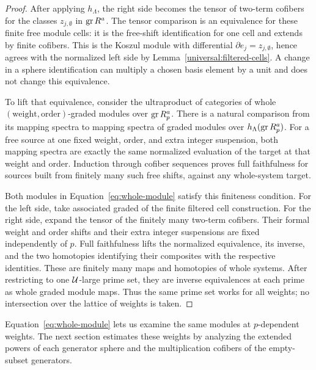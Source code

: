 \begin{proof}
After applying $h_\Lambda$, the right side becomes the tensor
of two-term cofibers for the classes $z_{j,\emptyset}$ in
$\operatorname{gr} R^a$. The tensor comparison is an equivalence for
these finite free module cells: it is the free-shift
identification for one cell and extends by finite cofibers.
This is the Koszul module with differential
$\partial e_j=z_{j,\emptyset}$, hence agrees with the
normalized left side by
Lemma~\ref{universal:filtered-cells}. A change in a sphere
identification can multiply a chosen basis element by a
unit and does not change this equivalence.

To lift that equivalence, consider the ultraproduct of
categories of whole $(\text{weight},\text{order})$-graded
modules over $\operatorname{gr} R_p^a$. There is a natural comparison
from its mapping spectra to mapping spectra of graded
modules over $h_\Lambda(\operatorname{gr} R_p^a)$. For a free source
at one fixed weight, order, and extra integer suspension,
both mapping spectra are exactly the same normalized
evaluation of the target at that weight and order.
Induction through cofiber sequences proves full faithfulness
for sources built from finitely many such free shifts,
against any whole-system target.

Both modules in Equation~\eqref{eq:whole-module} satisfy
this finiteness condition. For the left side, take
associated graded of the finite filtered cell construction.
For the right side, expand the tensor of the finitely many
two-term cofibers. Their formal weight and order shifts and
their extra integer suspensions are fixed independently
of $p$. Full faithfulness lifts the normalized equivalence,
its inverse, and the two homotopies identifying their
composites with the respective identities. These are
finitely many maps and homotopies of whole systems. After
restricting to one $\mathcal U$-large prime set, they are inverse
equivalences at each prime as whole graded module maps.
Thus the same prime set works for all weights; no
intersection over the lattice of weights is taken.
\end{proof}

Equation~\eqref{eq:whole-module} lets us examine the same modules
at $p$-dependent weights. The next section estimates these
weights by analyzing the extended powers of each generator
sphere and the multiplication cofibers of the empty-subset
generators.
